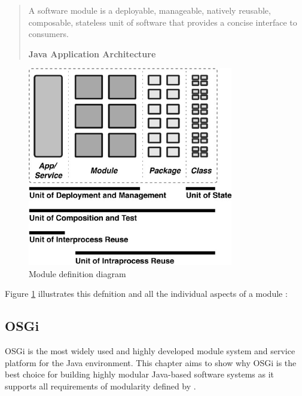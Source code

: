 \begin{quote}
A software module is a deployable, manageable, natively reusable, composable, stateless unit of software that provides a concise interface to consumers. 

\hfill \textbf{Java Application Architecture}

\hfill \citeauthor{Knoernschild:2012} \cite{Knoernschild:2012}
\end{quote}

\begin{figure}[H]
\centering
\includegraphics[width=0.8\textwidth]{module.jpeg}
\caption{Module definition diagram}
\label{fig:module}
\end{figure}

Figure \ref{fig:module} illustrates this defnition and all the individual aspects of a module \cite{Knoernschild:2012}:

\subsection{OSGi}
\gls{OSGi} is the most widely used and highly developed module system and service platform for the Java environment. This chapter aims to show why \gls{OSGi} is the best choice for building highly modular Java-based software systems as it supports all requirements of modularity defined by \citeauthor{Knoernschild:2012}\cite{Knoernschild:2012}.

